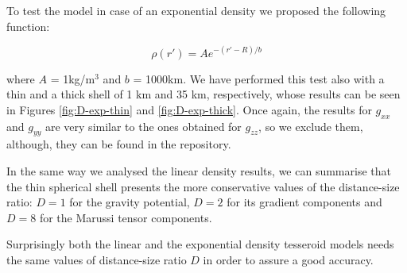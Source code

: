 \documentclass[extra]{gji}
\begin{document}
To test the model in case of an exponential density we proposed the following function:

\begin{equation}
    \rho(r') = A e^{-(r' - R)/b}
\label{eq:density-exp}
\end{equation}

\noindent where $A$ = 1kg/m$^3$ and $b$ = 1000km.
We have performed this test also with a thin and a thick shell of 1 km and 35 km, respectively, whose results can be seen in Figures \ref{fig:D-exp-thin} and \ref{fig:D-exp-thick}.
Once again, the results for $g_{xx}$ and $g_{yy}$ are very similar to the ones obtained for $g_{zz}$, so we exclude them, although, they can be found in the repository.

In the same way we analysed the linear density results, we can summarise that the thin spherical shell presents the more conservative values of the distance-size ratio: $D=1$ for the gravity potential, $D=2$ for its gradient components and $D=8$ for the Marussi tensor components.

Surprisingly both the linear and the exponential density tesseroid models needs the same values of distance-size ratio $D$ in order to assure a good accuracy.
\end{document}
